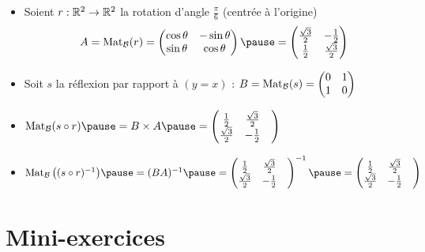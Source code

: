 \begin{frame}
\begin{exemple}
\begin{itemize}
  \item Soient $r : \mathbb{R}^2 \to \mathbb{R}^2$ la rotation d'angle $\frac\pi6$ (centrée à l'origine)
  \pause
 $$A = \Mat_{\mathcal{B}} (r) =  
  \begin{pmatrix}
\cos\theta & -\sin\theta\\
\sin\theta & \cos\theta
\end{pmatrix}
\pause=
\begin{pmatrix}
\frac{\sqrt{3}}{2} & -\frac12\\
\frac12& \frac{\sqrt{3}}{2}
\end{pmatrix}$$
\pause
    \item Soit $s$ la réflexion par rapport à $(y=x)$ 
    \pause:
    $B = \mathop{\text{Mat}}\nolimits_{\mathcal{B}} (s) = \begin{pmatrix} 0&1\\1&0 \end{pmatrix}$
  
  \pause
  \item $\Mat_{\mathcal{B}} (s \circ r) \pause= B \times A \pause= \begin{pmatrix}
\frac12&\frac{\sqrt{3}}{2} & \\
\frac{\sqrt{3}}{2}&-\frac12& 
\end{pmatrix}$

  \pause
  
  \item $\Mat_{\mathcal{B}} \big((s \circ r)^{-1}\big) \pause= (BA)^{-1} \pause=  \begin{pmatrix}
\frac12&\frac{\sqrt{3}}{2} & \\
\frac{\sqrt{3}}{2}&-\frac12& 
\end{pmatrix}^{-1} 
\pause= \begin{pmatrix}
\frac12&\frac{\sqrt{3}}{2} & \\
\frac{\sqrt{3}}{2}&-\frac12& 
\end{pmatrix}$ 

\end{itemize}
\end{exemple}
\end{frame}

\section{Mini-exercices}

